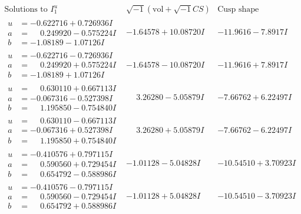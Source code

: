 \documentclass[1p]{elsarticle_modified}
\theoremstyle{definition}
\newcommand{\I}{\sqrt{-1}}
\begin{document}
$$\begin{array}{c|c|c}  
\text{Solutions to }I^u_{1}& \I (\text{vol} + \sqrt{-1}CS) & \text{Cusp shape}\\
 \hline 
\begin{aligned}
u &= -0.622716 + 0.726936 I \\
a &= \phantom{-}0.249920 - 0.575224 I \\
b &= -1.08189 - 1.07126 I\end{aligned}
 & -1.64578 + 10.08720 I & -11.9616 - 7.8917 I \\ \hline\begin{aligned}
u &= -0.622716 - 0.726936 I \\
a &= \phantom{-}0.249920 + 0.575224 I \\
b &= -1.08189 + 1.07126 I\end{aligned}
 & -1.64578 - 10.08720 I & -11.9616 + 7.8917 I \\ \hline\begin{aligned}
u &= \phantom{-}0.630110 + 0.667113 I \\
a &= -0.067316 - 0.527398 I \\
b &= \phantom{-}1.195850 - 0.754840 I\end{aligned}
 & \phantom{-}3.26280 - 5.05879 I & -7.66762 + 6.22497 I \\ \hline\begin{aligned}
u &= \phantom{-}0.630110 - 0.667113 I \\
a &= -0.067316 + 0.527398 I \\
b &= \phantom{-}1.195850 + 0.754840 I\end{aligned}
 & \phantom{-}3.26280 + 5.05879 I & -7.66762 - 6.22497 I \\ \hline\begin{aligned}
u &= -0.410576 + 0.797115 I \\
a &= \phantom{-}0.590560 + 0.729454 I \\
b &= \phantom{-}0.654792 - 0.588986 I\end{aligned}
 & -1.01128 - 5.04828 I & -10.54510 + 3.70923 I \\ \hline\begin{aligned}
u &= -0.410576 - 0.797115 I \\
a &= \phantom{-}0.590560 - 0.729454 I \\
b &= \phantom{-}0.654792 + 0.588986 I\end{aligned}
 & -1.01128 + 5.04828 I & -10.54510 - 3.70923 I \\ \hline\begin{aligned}

\end{aligned}
\end{array}$$
\end{document}

